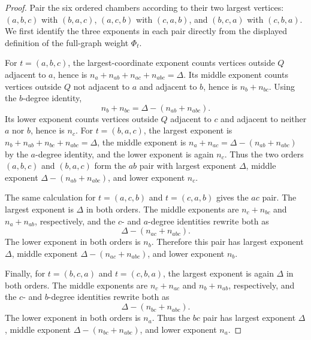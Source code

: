 \begin{proof}
Pair the six ordered chambers according to their two largest vertices:
$(a,b,c)$ with $(b,a,c)$, $(a,c,b)$ with $(c,a,b)$, and $(b,c,a)$ with
$(c,b,a)$.  We first identify the three exponents in each pair directly
from the displayed definition of the full-graph weight $\Phi_t$.

For $t=(a,b,c)$, the largest-coordinate exponent counts vertices outside
$Q$ adjacent to $a$, hence is
$n_a+n_{ab}+n_{ac}+n_{abc}=\Delta$.  Its middle exponent counts vertices
outside $Q$ not adjacent to $a$ and adjacent to $b$, hence is
$n_b+n_{bc}$.  Using the $b$-degree identity,
\[
n_b+n_{bc}=\Delta-(n_{ab}+n_{abc}).
\]
Its lower exponent counts vertices outside $Q$ adjacent to $c$ and adjacent
to neither $a$ nor $b$, hence is $n_c$.  For $t=(b,a,c)$, the largest
exponent is $n_b+n_{ab}+n_{bc}+n_{abc}=\Delta$, the middle exponent is
$n_a+n_{ac}=\Delta-(n_{ab}+n_{abc})$ by the $a$-degree identity, and the
lower exponent is again $n_c$.  Thus the two orders $(a,b,c)$ and
$(b,a,c)$ form the $ab$ pair with largest exponent $\Delta$, middle
exponent $\Delta-(n_{ab}+n_{abc})$, and lower exponent $n_c$.

The same calculation for $t=(a,c,b)$ and $t=(c,a,b)$ gives the $ac$ pair.
The largest exponent is $\Delta$ in both orders.  The middle exponents are
$n_c+n_{bc}$ and $n_a+n_{ab}$, respectively, and the $c$- and $a$-degree
identities rewrite both as
\[
\Delta-(n_{ac}+n_{abc}).
\]
The lower exponent in both orders is $n_b$.  Therefore this pair has
largest exponent $\Delta$, middle exponent $\Delta-(n_{ac}+n_{abc})$, and
lower exponent $n_b$.

Finally, for $t=(b,c,a)$ and $t=(c,b,a)$, the largest exponent is again
$\Delta$ in both orders.  The middle exponents are $n_c+n_{ac}$ and
$n_b+n_{ab}$, respectively, and the $c$- and $b$-degree identities rewrite
both as
\[
\Delta-(n_{bc}+n_{abc}).
\]
The lower exponent in both orders is $n_a$.  Thus the $bc$ pair has largest
exponent $\Delta$, middle exponent $\Delta-(n_{bc}+n_{abc})$, and lower
exponent $n_a$.


\end{proof}
